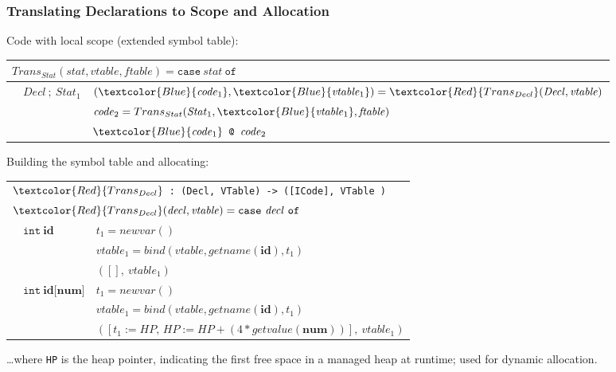 \documentclass{beamer}
\newcommand{\codesize}{\footnotesize}
\newcommand{\cd}[1]{{{\codesize\tt #1}}}
\newcommand{\red}[1]{\textcolor{Red}{{#1}}}
\newcommand{\blue}[1]{\textcolor{Blue}{{#1}}}
\begin{document}
\begin{frame}
	\frametitle{Translating Declarations to Scope and Allocation}

Code with local scope (extended symbol table):
\medskip

{\footnotesize
\begin{tabular}{lll}
\multicolumn{3}{l}{$ Trans_{Stat}(\mathit{stat},\mathit{vtable},\mathit{ftable})
 = \mathtt{case}~\mathit{stat}~\mathtt{of}$} \\\hline

&$\mathit{Decl}~;~\mathit{Stat}_1$
        & $(\blue{\mathit{code}_1},\blue{\mathit{vtable}_1}) = \red{Trans_{Decl}}(\mathit{Decl},\mathit{vtable})$ \\
&        & $\mathit{code}_2 = Trans_{Stat}(\mathit{Stat}_1,\blue{\mathit{vtable}_1},\mathit{ftable})$ \\
&        & $\blue{\mathit{code}_1} \concat \mathit{code}_2$ \\\hline
\end{tabular}
}
\bigskip

\pause
Building the symbol table and allocating:
\medskip

{\footnotesize
\begin{tabular}{lll}
\multicolumn{3}{l}{$\red{Trans_{Decl}}$\cd{~:~(Decl, VTable) -> ([ICode], VTable )}}\\
\multicolumn{3}{l}{$\red{Trans_{Decl}}(\mathit{decl},\mathit{vtable})
 = \mathtt{case}~\mathit{decl}~\mathtt{of}$} \\\hline

&$\mathtt{int}~\mathbf{id}$
        & $t_1 = \mathit{newvar}()$ \\
&        & $\mathit{vtable}_1 = \mathit{bind}(\mathit{vtable}, \mathit{getname}(\mathbf{id}), t_1)$ \\
&        & $([],\:\mathit{vtable}_1)$ \\\hline
&$\mathtt{int}~\mathbf{id}{[}\mathbf{num}{]}$
        & $t_1 = \mathit{newvar}()$ \\
&        & $\mathit{vtable}_1 = \mathit{bind}(\mathit{vtable}, \mathit{getname}(\mathbf{id}), t_1)$ \\
&        & $([t_1 := HP,\, HP := HP + (4*\mathit{getvalue}(\mathbf{num}))],\:\mathit{vtable}_1)$ \\\hline
\end{tabular}

\bigskip

\ldots where \cd{HP} is the heap pointer, indicating the first free space in a managed heap at 
runtime; used for dynamic allocation.

}
\end{frame}
\end{document}
